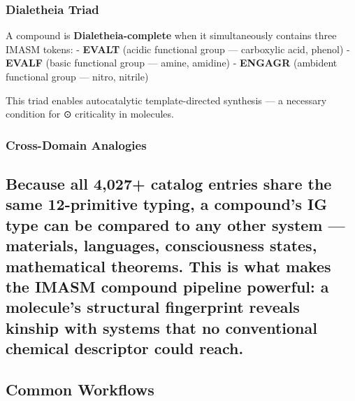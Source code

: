 \documentclass[12pt,a4paper]{article}
\begin{document}
\hypertarget{dialetheia-triad}{%
\subsubsection{Dialetheia Triad}\label{dialetheia-triad}}

A compound is \textbf{Dialetheia-complete} when it simultaneously
contains three IMASM tokens: - \textbf{EVALT} (acidic functional group
--- carboxylic acid, phenol) - \textbf{EVALF} (basic functional group
--- amine, amidine) - \textbf{ENGAGR} (ambident functional group ---
nitro, nitrile)

This triad enables autocatalytic template-directed synthesis --- a
necessary condition for ⊙ criticality in molecules.

\hypertarget{cross-domain-analogies}{%
\subsubsection{Cross-Domain Analogies}\label{cross-domain-analogies}}

\hypertarget{because-all-4027-catalog-entries-share-the-same-12-primitive-typing-a-compounds-ig-type-can-be-compared-to-any-other-system-materials-languages-consciousness-states-mathematical-theorems.-this-is-what-makes-the-imasm-compound-pipeline-powerful-a-molecules-structural-fingerprint-reveals-kinship-with-systems-that-no-conventional-chemical-descriptor-could-reach.}{%
\subsection{Because all 4,027+ catalog entries share the same
12-primitive typing, a compound's IG type can be compared to any other
system --- materials, languages, consciousness states, mathematical
theorems. This is what makes the IMASM compound pipeline powerful: a
molecule's structural fingerprint reveals kinship with systems that no
conventional chemical descriptor could
reach.}\label{because-all-4027-catalog-entries-share-the-same-12-primitive-typing-a-compounds-ig-type-can-be-compared-to-any-other-system-materials-languages-consciousness-states-mathematical-theorems.-this-is-what-makes-the-imasm-compound-pipeline-powerful-a-molecules-structural-fingerprint-reveals-kinship-with-systems-that-no-conventional-chemical-descriptor-could-reach.}}

\hypertarget{common-workflows}{%
\subsection{Common Workflows}\label{common-workflows}}
\end{document}
